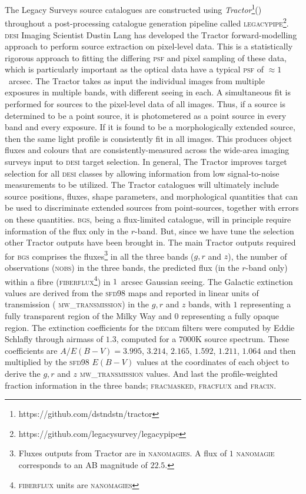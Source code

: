 \documentclass[fleqn,usenatbib]{mnras}
\newcommand{\BGS}{\textsc{bgs}\xspace}
\newcommand{\DECam}{\textsc{dec}am\xspace}
\newcommand{\DESI}{\textsc{desi}\xspace}
\newcommand{\FIBERFLUX}{{\textsc{fiberflux}}\xspace}
\newcommand{\FRACMASKED}{{\textsc{fracmasked}}\xspace}
\newcommand{\FRACFLUX}{{\textsc{fracflux}}\xspace}
\newcommand{\FRACIN}{{\textsc{fracin}}\xspace}
\newcommand{\MWTRANSMISSION}{{\textsc{ mw\_transmission}}\xspace}
\newcommand{\NOBS}{\textsc{nobs}\xspace}
\newcommand{\PSF}{\textsc{psf}\xspace}
\newcommand{\TRACTOR}{\textsc{T}ractor\xspace}
\newcommand{\LEGACYPIPE}{\textsc{legacypipe}\xspace}
\newcommand{\NANOMAGIES}{\textsc{nanomagies}\xspace}
\newcommand{\NANOMAGIE}{\textsc{nanomagie}\xspace}
\begin{document}
The Legacy Surveys source catalogues are constructed using {\it Tractor}\footnote{https://github.com/dstndstn/tractor}(\cite{2016ascl.soft04008L}) throughout a post-processing catalogue generation pipeline called \LEGACYPIPE \footnote{https://github.com/legacysurvey/legacypipe}. \DESI Imaging Scientist Dustin Lang has developed the \TRACTOR forward-modelling approach to
perform source extraction on pixel-level data. This is a statistically rigorous approach to fitting the differing \PSF and pixel sampling of these data, which is particularly important as the optical data have a typical \PSF of $\approx 1$~arcsec.
The \TRACTOR takes as input the individual images from multiple exposures in multiple
bands, with different seeing in each. A simultaneous fit is performed for sources to the pixel-level data of all images. Thus, if a source is determined to be a point source, it is photometered as a point source in every band and every exposure. If it is found to be a morphologically extended source, then the same light profile is consistently fit in all images. This produces object fluxes and colours that are consistently-measured across the wide-area imaging surveys input to \DESI target selection. In general, The \TRACTOR improves target selection for all \DESI classes by allowing information from low signal-to-noise measurements to be utilized. The \TRACTOR catalogues will ultimately include source positions, fluxes, shape parameters, and morphological quantities that can be used to discriminate extended sources from point-sources, together with errors on these quantities. \BGS, being a flux-limited catalogue, will in principle require information of the flux only in the $r$-band. But, since we have tune the selection other \TRACTOR outputs have been brought in. The main \TRACTOR outputs required for \BGS comprises the fluxes\footnote{Fluxes outputs from \TRACTOR are in \NANOMAGIES. A flux of $1$ \NANOMAGIE corresponds to an AB magnitude of $22.5$.} in all the three bands ($g,r$ and $z$), the number of observations (\NOBS) in the three bands, the predicted flux (in the $r$-band only) within a fibre (\FIBERFLUX\footnote{\FIBERFLUX units are \NANOMAGIES}) in $1$~arcsec Gaussian seeing. The Galactic extinction values are derived from the \textsc{sfd98} maps \citep{1998ApJ...500..525S} and reported in linear units of transmission (\MWTRANSMISSION) in the $g,r$ and $z$ bands, with $1$ representing a fully transparent region of the Milky Way and $0$ representing a fully opaque region. The extinction coefficients for the \DECam filters were computed by Eddie Schlafly \citep{2011ApJ...737..103S} through airmass of $1.3$, computed for a $7000$K source spectrum. These coefficients are $A / E(B-V) = 3.995$, $3.214$, $2.165$, $1.592$, $1.211$, $1.064$ and then multiplied by the \textsc{sfd98} $E(B-V)$ values at the coordinates of each object to derive the $g, r$ and $z$ \MWTRANSMISSION values. And last the profile-weighted fraction information in the three bands; \FRACMASKED, \FRACFLUX and \FRACIN.
\end{document}
